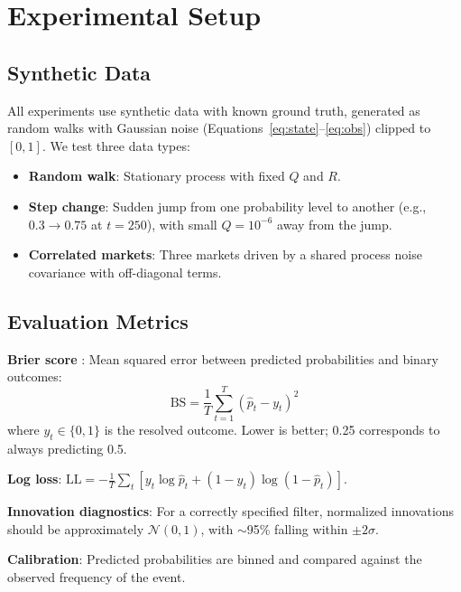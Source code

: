 \documentclass[11pt, a4paper]{article}
\begin{document}
\section{Experimental Setup}

\subsection{Synthetic Data}

All experiments use synthetic data with known ground truth, generated as random walks with Gaussian noise (Equations~\ref{eq:state}--\ref{eq:obs}) clipped to $[0,1]$. We test three data types:

\begin{itemize}
    \item \textbf{Random walk}: Stationary process with fixed $Q$ and $R$.
    \item \textbf{Step change}: Sudden jump from one probability level to another (e.g., $0.3 \to 0.75$ at $t = 250$), with small $Q = 10^{-6}$ away from the jump.
    \item \textbf{Correlated markets}: Three markets driven by a shared process noise covariance with off-diagonal terms.
\end{itemize}

\subsection{Evaluation Metrics}

\textbf{Brier score} \citep{brier1950}: Mean squared error between predicted probabilities and binary outcomes:
\begin{equation}
    \text{BS} = \frac{1}{T} \sum_{t=1}^{T} (\hat{p}_t - y_t)^2
\end{equation}
where $y_t \in \{0, 1\}$ is the resolved outcome. Lower is better; 0.25 corresponds to always predicting 0.5.

\textbf{Log loss}: $\text{LL} = -\frac{1}{T} \sum_t \left[y_t \log \hat{p}_t + (1 - y_t) \log(1 - \hat{p}_t)\right]$.

\textbf{Innovation diagnostics}: For a correctly specified filter, normalized innovations should be approximately $\mathcal{N}(0,1)$, with $\sim$95\% falling within $\pm 2\sigma$.

\textbf{Calibration}: Predicted probabilities are binned and compared against the observed frequency of the event.
\end{document}
